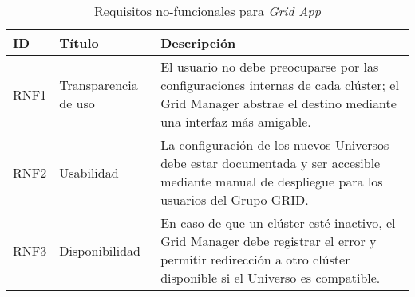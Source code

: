 \begin{table}[H]
	\centering
	\renewcommand{\arraystretch}{1.2} %
	\fontsize{9pt}{10pt}\selectfont %
	\begin{tabular}{|p{1cm}|p{4cm}|p{8cm}|} %
		\hline
		\textbf{ID}                              & \textbf{Título}                               & \textbf{Descripción} \\
        \hline
		RNF1 & Transparencia de uso & El usuario no debe preocuparse por las configuraciones internas de cada clúster; el Grid Manager abstrae el destino mediante una interfaz más amigable. \\
		RNF2 & Usabilidad & La configuración de los nuevos Universos debe estar documentada y ser accesible mediante manual de despliegue para los usuarios del Grupo GRID. \\
		RNF3 & Disponibilidad & En caso de que un clúster esté inactivo, el Grid Manager debe registrar el error y permitir redirección a otro clúster disponible si el Universo es compatible. \\
        \hline
	\end{tabular}
	\caption{Requisitos no-funcionales para \textit{Grid App}}
	\label{table:requisitosNoFuncionales}
\end{table}